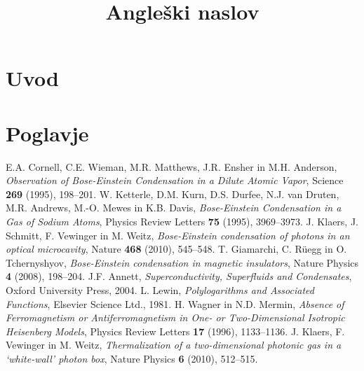 \documentclass[twoside,11pt]{article}
\begin{document}




\klasifikacija{~} 
\title{Angleški naslov}

\glava\baselineskip=14.5pt

\smallskip

\section{Uvod}

\section{Poglavje}

\begin{thebibliography}{99}

 E.A. Cornell, C.E. Wieman, M.R. Matthews, J.R. Ensher in M.H. Anderson, \emph{Observation of Bose-Einstein Condensation in a Dilute Atomic Vapor}, Science \textbf{269} (1995), 198--201. 
 W. Ketterle, D.M. Kurn, D.S. Durfee, N.J. van Druten, M.R. Andrews, M.-O. Mewes in K.B. Davis, \emph{Bose-Einstein Condensation in a Gas of Sodium Atoms}, Physics Review Letters \textbf{75} (1995), 3969--3973. 
 J. Klaers, J. Schmitt, F. Vewinger in M. Weitz, \emph{Bose-Einstein condensation of photons in an optical microcavity}, Nature \textbf{468} (2010), 545--548. 
 T. Giamarchi, C. R\"uegg in O. Tchernyshyov, \emph{Bose-Einstein condensation in magnetic insulators}, Nature Physics \textbf{4} (2008), 198--204. 
 J.F. Annett, \emph{Superconductivity, Superfluids and Condensates}, Oxford University Press, 2004.
 L. Lewin, \emph{Polylogarithms and Associated Functions}, Elsevier Science Ltd., 1981. 
 H. Wagner in N.D. Mermin, \emph{Absence of Ferromagnetism or Antiferromagnetism in One- or Two-Dimensional Isotropic Heisenberg Models}, Physics Review Letters  \textbf{17} (1996), 1133--1136.
 J. Klaers, F. Vewinger in M. Weitz, \emph{Thermalization of a two-dimensional photonic gas in a ‘white-wall’ photon box}, Nature Physics \textbf{6} (2010), 512--515.

\end{thebibliography}
\end{document}

